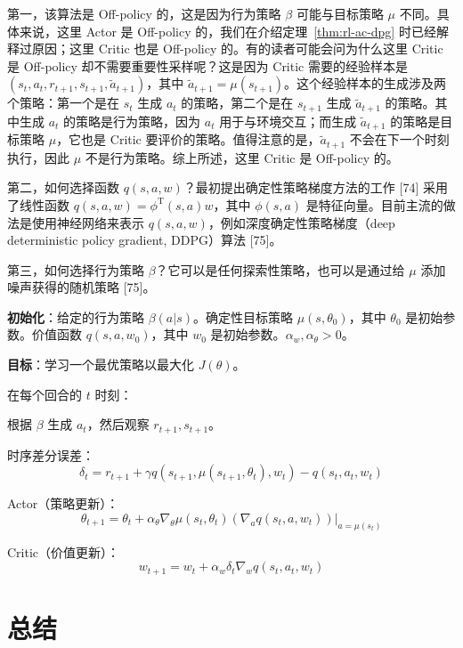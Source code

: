 第一，该算法是 Off-policy 的，这是因为行为策略 $\beta$ 可能与目标策略 $\mu$ 不同。具体来说，这里 Actor 是 Off-policy 的，我们在介绍定理~\ref{thm:rl-ac-dpg} 时已经解释过原因；这里 Critic 也是 Off-policy 的。有的读者可能会问为什么这里 Critic 是 Off-policy 却不需要重要性采样呢？这是因为 Critic 需要的经验样本是 $(s_{t}, a_{t}, r_{t+1}, s_{t+1}, \tilde{a}_{t+1})$，其中 $\tilde{a}_{t+1} = \mu(s_{t+1})$。这个经验样本的生成涉及两个策略：第一个是在 $s_{t}$ 生成 $a_{t}$ 的策略，第二个是在 $s_{t+1}$ 生成 $\tilde{a}_{t+1}$ 的策略。其中生成 $a_{t}$ 的策略是行为策略，因为 $a_{t}$ 用于与环境交互；而生成 $\tilde{a}_{t+1}$ 的策略是目标策略 $\mu$，它也是 Critic 要评价的策略。值得注意的是，$\tilde{a}_{t+1}$ 不会在下一个时刻执行，因此 $\mu$ 不是行为策略。综上所述，这里 Critic 是 Off-policy 的。

第二，如何选择函数 $q(s, a, w)$？最初提出确定性策略梯度方法的工作 [74] 采用了线性函数 $q(s, a, w) = \phi^{\mathrm{T}}(s, a) w$，其中 $\phi(s, a)$ 是特征向量。目前主流的做法是使用神经网络来表示 $q(s, a, w)$，例如深度确定性策略梯度（deep deterministic policy gradient, DDPG）算法 [75]。

第三，如何选择行为策略 $\beta$？它可以是任何探索性策略，也可以是通过给 $\mu$ 添加噪声获得的随机策略 [75]。

\begin{algo}\label{alg:rl-ac-dpg}
\textbf{初始化}：给定的行为策略 $\beta(a | s)$。确定性目标策略 $\mu(s, \theta_{0})$，其中 $\theta_{0}$ 是初始参数。价值函数 $q(s, a, w_{0})$，其中 $w_{0}$ 是初始参数。$\alpha_{w}, \alpha_{\theta} > 0$。

\textbf{目标}：学习一个最优策略以最大化 $J(\theta)$。

在每个回合的 $t$ 时刻：

\quad 根据 $\beta$ 生成 $a_{t}$，然后观察 $r_{t+1}, s_{t+1}$。

\quad 时序差分误差：
\[
\delta_{t} = r_{t+1} + \gamma q(s_{t+1}, \mu(s_{t+1}, \theta_{t}), w_{t}) - q(s_{t}, a_{t}, w_{t})
\]

\quad Actor（策略更新）：
\[
\theta_{t+1} = \theta_{t} + \alpha_{\theta} \nabla_{\theta} \mu(s_{t}, \theta_{t}) (\nabla_{a} q(s_{t}, a, w_{t})) |_{a = \mu(s_{t})}
\]

\quad Critic（价值更新）：
\[
w_{t+1} = w_{t} + \alpha_{w} \delta_{t} \nabla_{w} q(s_{t}, a_{t}, w_{t})
\]
\end{algo}

\section{总结}
\label{sec:rl-ac-summary}

